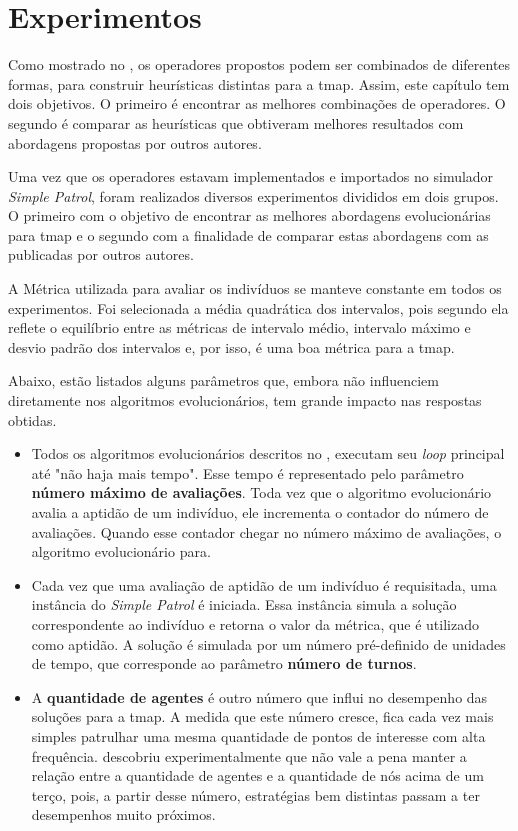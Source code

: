 \chapter{Experimentos}
\label{experimentos}

Como mostrado no , os operadores propostos podem ser 
combinados de diferentes formas, para construir heurísticas distintas para a 
\ac{tmap}. Assim, este capítulo tem dois objetivos. O primeiro é encontrar as 
melhores combinações de operadores. O segundo é comparar as heurísticas que 
obtiveram melhores resultados com abordagens propostas por outros autores.

Uma vez que os operadores estavam implementados e importados no simulador 
\textit{Simple Patrol}, foram realizados diversos experimentos divididos em dois 
grupos. O primeiro com o objetivo de encontrar as melhores abordagens 
evolucionárias para \ac{tmap} e o segundo com a finalidade de comparar estas 
abordagens com as publicadas por outros autores.

A Métrica utilizada para avaliar os indivíduos se manteve constante em todos 
os experimentos. Foi selecionada a média quadrática dos intervalos, pois segundo 
\citep{sampaiophd} ela reflete o equilíbrio entre as métricas de intervalo 
médio, intervalo máximo e desvio padrão dos intervalos e, por isso, é uma boa 
métrica para a \ac{tmap}.

Abaixo, estão listados alguns parâmetros que, embora não influenciem diretamente 
nos algoritmos evolucionários, tem grande impacto nas respostas obtidas.

\begin{itemize}
	\item Todos os algoritmos evolucionários descritos no , 
	executam seu \textit{loop} principal até "não haja mais tempo". Esse tempo é 
	representado pelo parâmetro \textbf{número máximo de avaliações}. Toda vez 
	que o algoritmo evolucionário avalia a aptidão de um indivíduo, ele 
	incrementa o contador do número de avaliações. Quando esse contador chegar 
	no número máximo de avaliações, o algoritmo evolucionário para.
	\item Cada vez que uma avaliação de aptidão de um indivíduo é requisitada, 
	uma instância do \textit{Simple Patrol} é iniciada. Essa instância simula 
	a solução correspondente ao indivíduo e retorna o valor da métrica, que é 
	utilizado como aptidão. A solução é simulada por um número pré-definido de 
	unidades de tempo, que corresponde ao parâmetro \textbf{número de turnos}.
	\item A \textbf{quantidade de agentes} é outro número que influi no 
	desempenho das soluções para a \ac{tmap}. A medida que este número cresce, 
	fica cada vez mais simples patrulhar uma mesma quantidade de pontos de 
	interesse com alta frequência. \citep{sampaiophd} descobriu 
	experimentalmente que não vale a pena manter a relação entre a quantidade de 
	agentes e a quantidade de nós acima de um terço, pois, a partir desse número, 
	estratégias bem distintas passam a ter desempenhos muito próximos.
\end{itemize}

